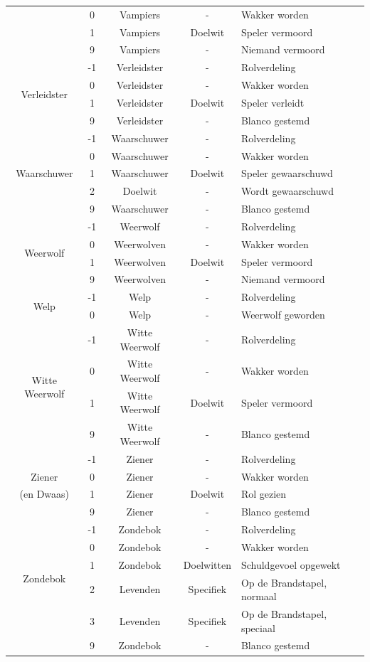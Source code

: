 \documentclass[12pt]{article}
\begin{document}
\begin{center}
\begin{longtable}{c|c|c|c|l}
       & 0 & Vampiers & - & Wakker worden \\
       & 1 & Vampiers & Doelwit & Speler vermoord \\
       & 9 & Vampiers & - & Niemand vermoord \\
      \hline
      \multirow{4}{*}{Verleidster} & -1 & Verleidster & - & Rolverdeling \\
       & 0 & Verleidster & - & Wakker worden \\
       & 1 & Verleidster & Doelwit & Speler verleidt \\
       & 9 & Verleidster & - & Blanco gestemd \\
      \hline
      \multirow{5}{*}{Waarschuwer} & -1 & Waarschuwer & - & Rolverdeling \\
       & 0 & Waarschuwer & - & Wakker worden \\
       & 1 & Waarschuwer & Doelwit & Speler gewaarschuwd \\
       & 2 & Doelwit & - & Wordt gewaarschuwd \\
       & 9 & Waarschuwer & - & Blanco gestemd \\
      \hline
      \multirow{4}{*}{Weerwolf} & -1 & Weerwolf & - & Rolverdeling \\
       & 0 & Weerwolven & - & Wakker worden \\
       & 1 & Weerwolven & Doelwit & Speler vermoord \\
       & 9 & Weerwolven & - & Niemand vermoord \\
      \hline
      \multirow{2}{*}{Welp} & -1 & Welp & - & Rolverdeling \\
       & 0 & Welp & - & Weerwolf geworden \\
      \hline
      \multirow{4}{*}{Witte Weerwolf} & -1 & Witte Weerwolf & - & Rolverdeling \\
       & 0 & Witte Weerwolf & - & Wakker worden \\
       & 1 & Witte Weerwolf & Doelwit & Speler vermoord \\
       & 9 & Witte Weerwolf & - & Blanco gestemd \\
      \hline
       & -1 & Ziener & - & Rolverdeling \\
      Ziener & 0 & Ziener & - & Wakker worden \\
      (en Dwaas) & 1 & Ziener & Doelwit & Rol gezien \\
       & 9 & Ziener & - & Blanco gestemd \\
      \hline
      \multirow{5}{*}{Zondebok} & -1 & Zondebok & - & Rolverdeling \\
       & 0 & Zondebok & - & Wakker worden \\
       & 1 & Zondebok & Doelwitten & Schuldgevoel opgewekt \\
       & 2 & Levenden & Specifiek & Op de Brandstapel, normaal \\
       & 3 & Levenden & Specifiek & Op de Brandstapel, speciaal \\
       & 9 & Zondebok & - & Blanco gestemd \\
    \end{longtable}
  \end{center}
\end{document}
